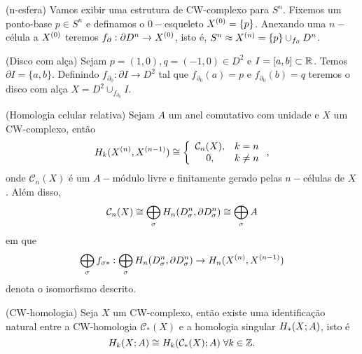 \documentclass{beamer}
\begin{document}
\begin{frame}
	\begin{exemplo}
		(n-esfera) Vamos exibir uma estrutura de CW-complexo para $S^{n}$. Fixemos um ponto-base $p \in S^{n}$ e definamos o $0-$esqueleto $X^{(0)}=\{p\}$. Anexando uma $n-$célula a $X^{(0)}$ teremos $f_{\partial}: \partial D^{n} \to X^{(0)}$, isto é, $S^{n} \approx X^{(n)} = \{p\}\cup_{f_{\partial}} D^{n}_{}$.
	\end{exemplo}
	\begin{exemplo}
		(Disco com alça) Sejam $p=(1,0), q=(-1,0) \in D^{2}$ e $I=[a,b] \subset \mathbb{R}^{}$. Temos $\partial I=\{a,b\}$. Definindo $f_{\partial_{0}}: \partial I \to D^{2}$ tal que $f_{\partial_{0}}(a)=p$ e $f_{\partial_{0}}(b)=q$ teremos o disco com alça $X=D^{2}\cup_{f_{\partial_{0}}}I$.   
	\end{exemplo}
\end{frame}

\begin{frame}
	
	\begin{lema}
		(Homologia celular relativa) Sejam $A$ um anel comutativo com unidade e $X$ um CW-complexo, então
		$$
		H_{k}(X^{(n)}, X^{(n-1)}) \cong 
		\left\{
		\begin{array}{cc}
		\mathcal{C}_{n}(X), & k = n\\
		0, & k\neq n\\
		\end{array}
		\right.,
		$$
		onde $\mathcal{C}_{n}(X)$ é um $A-$módulo livre e finitamente gerado pelas $n-$células de $X$. Além disso,
		$$
		\mathcal{C}_{n}(X) \cong \bigoplus \limits_{\sigma} H_{n}(D^{n}_{\sigma}, \partial D^{n}_{\sigma}) \cong \bigoplus \limits_{\sigma} A
		$$
		em que 
		$$
		\bigoplus \limits_{\sigma}f_{\sigma*}: \bigoplus \limits_{\sigma} H_{n}(D^{n}_{\sigma}, \partial D^{n}_{\sigma}) \to H_{n}(X^{(n)}, X^{(n-1)})
		$$
		denota o isomorfismo descrito.
	\end{lema}
\end{frame}

\begin{frame}
	\begin{teorema}
		(CW-homologia) Seja $X$ um CW-complexo, então existe uma identificação natural entre a CW-homologia $\mathcal{C}_{*}(X)$ e a homologia singular $H_{*}(X;A)$, isto é 
		$$
		H_{k}(X;A) \cong H_{k}(\mathcal{C}_{*}(X);A)\; \forall k \in \mathbb{Z}.
		$$
	\end{teorema}
\end{frame}
\end{document}
